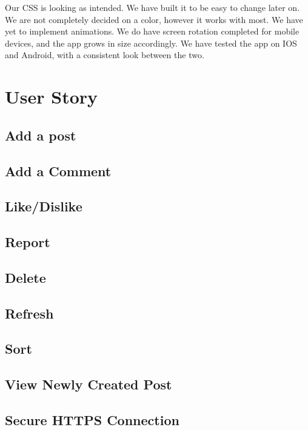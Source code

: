 \documentclass[12pt]{article}
\begin{document}
Our CSS is looking as intended. We have built it to be easy to change later on.
We are not completely decided on a color, however it works with most. We have
yet to implement animations. We do have screen rotation completed for mobile
devices, and the app grows in size accordingly. We have tested the app on IOS
and Android, with a consistent look between the two.

\section{User Story}

\subsection{Add a post}

\subsection{Add a Comment}

\subsection{Like/Dislike}

\subsection{Report}

\subsection{Delete}

\subsection{Refresh}

\subsection{Sort}

\subsection{View Newly Created Post}

\subsection{Secure HTTPS Connection}
\end{document}
